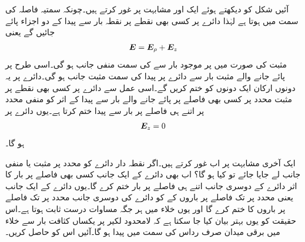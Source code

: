 آئیں شکل  کو دیکھتے ہوئے  ایک اور مشابہت پر غور کرتے ہیں۔چونکہ  سمتیہ فاصلہ  کی سمت میں ہوتا ہے لہٰذا دائرے پر کسی بھی نقطے پر نقطہ بار  سے پیدا   کے دو اجزاء پائے جائیں گے یعنی
\begin{align}
{\ensuremath{{\boldsymbol{E}}}}={{\boldsymbol{E}}}_\rho+{{\boldsymbol{E}}}_z
\end{align}
مثبت  کی صورت میں  پر موجود بار سے   کی سمت منفی   جانب ہو گی۔اسی طرح  پر پائے جانے والے مثبت بار سے دائرے پر پیدا  کی سمت مثبت  جانب ہو گی۔دائرے پر یہ دونوں ارکان ایک دونوں کو ختم کریں گے۔اسی عمل سے دائرے پر کسی بھی نقطے پر مثبت  محدد پر کسی  بھی  فاصلے پر پائے جانے والے بار سے پیدا  کے اثر کو منفی  محدد پر اتنے ہی فاصلے پر بار سے پیدا   ختم کرتا ہے۔یوں دائرے پر
\begin{align}\label{مساوات_کولمب_لامحدود_بار_رداس_کا_میدان_صفر}
{\ensuremath{{\boldsymbol{E}}}}_z=0
\end{align}
ہو گا۔

ایک آخری مشابہت پر اب غور کرتے ہیں۔اگر نقطہ دار دائرے کو  محدد پر مثبت یا منفی جانب  لے جایا جائے تو کیا ہو گا؟ اب بھی دائرے  کے ایک جانب کسی بھی فاصلے پر بار کا اثر دائرے کے دوسری جانب اتنے ہی فاصلے پر بار ختم کرے گا۔یوں دائرے کے ایک جانب یعنی  محدد پر  تک فاصلے پر باروں کے  کو دائرے کی دوسری جانب  محدد پر  تک فاصلے پر باروں کا  ختم کرے گا اور یوں خلاء میں  ہر جگہ مساوات  درست ثابت ہوتا ہے۔اس حقیقت کو یوں بہتر بیان کیا جا سکتا ہے کہ  لامحدود لکیر پر یکساں کثافت بار  سے خلاء میں برقی میدان صرف رداس کی سمت میں پیدا ہو گا۔آئیں  اس  کو حاصل کریں۔

